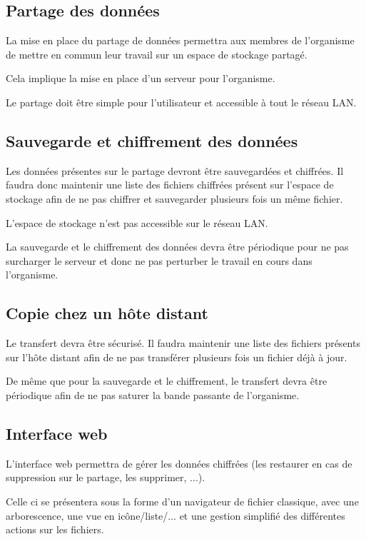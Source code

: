 \subsection{Partage des données}

La mise en place du partage de données permettra aux membres de l'organisme de mettre en commun
leur travail sur un espace de stockage partagé.

Cela implique la mise en place d'un serveur pour l'organisme.

Le partage doit être simple pour l'utilisateur et accessible à tout le réseau LAN.

\subsection{Sauvegarde et chiffrement des données}

Les données présentes sur le partage devront être sauvegardées et chiffrées.
Il faudra donc maintenir une liste des fichiers chiffrées présent sur l'espace de stockage
afin de ne pas chiffrer et sauvegarder plusieurs fois un même fichier.

L'espace de stockage n'est pas accessible sur le réseau LAN.

La sauvegarde et le chiffrement des données devra être périodique pour ne pas surcharger le
serveur et donc ne pas perturber le travail en cours dans l'organisme.

\subsection{Copie chez un hôte distant}

Le transfert devra être sécurisé. Il faudra maintenir une liste des fichiers présents sur l'hôte
distant afin de ne pas transférer plusieurs fois un fichier déjà à jour.

De même que pour la sauvegarde et le chiffrement, le transfert devra être périodique afin de ne
pas saturer la bande passante de l'organisme.

\subsection{Interface web}

L'interface web permettra de gérer les données chiffrées (les restaurer en cas de suppression
sur le partage, les supprimer, ...).

Celle ci se présentera sous la forme d'un navigateur de fichier classique, avec une arborescence,
une vue en icône/liste/... et une gestion simplifié des différentes actions sur les fichiers.


